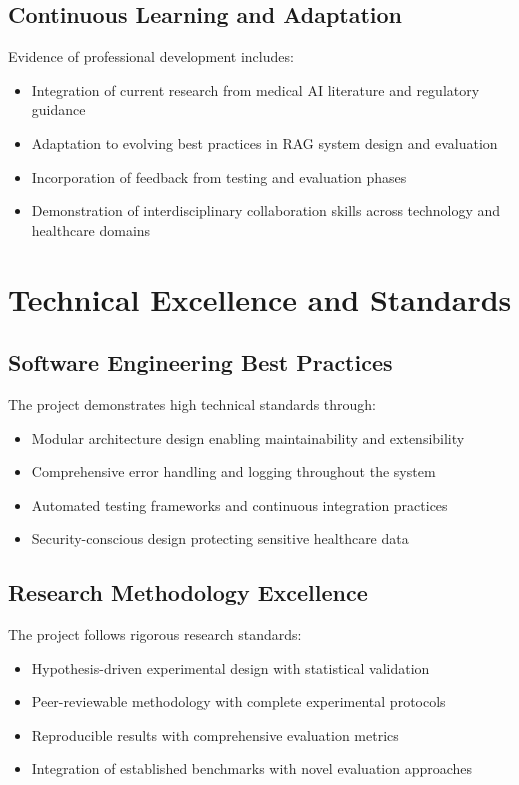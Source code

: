 \subsection{Continuous Learning and Adaptation}
Evidence of professional development includes:
\begin{itemize}
    \item Integration of current research from medical AI literature and regulatory guidance
    \item Adaptation to evolving best practices in RAG system design and evaluation
    \item Incorporation of feedback from testing and evaluation phases
    \item Demonstration of interdisciplinary collaboration skills across technology and healthcare domains
\end{itemize}

\section{Technical Excellence and Standards}

\subsection{Software Engineering Best Practices}
The project demonstrates high technical standards through:
\begin{itemize}
    \item Modular architecture design enabling maintainability and extensibility
    \item Comprehensive error handling and logging throughout the system
    \item Automated testing frameworks and continuous integration practices
    \item Security-conscious design protecting sensitive healthcare data
\end{itemize}

\subsection{Research Methodology Excellence}
The project follows rigorous research standards:
\begin{itemize}
    \item Hypothesis-driven experimental design with statistical validation
    \item Peer-reviewable methodology with complete experimental protocols
    \item Reproducible results with comprehensive evaluation metrics
    \item Integration of established benchmarks with novel evaluation approaches
\end{itemize}

